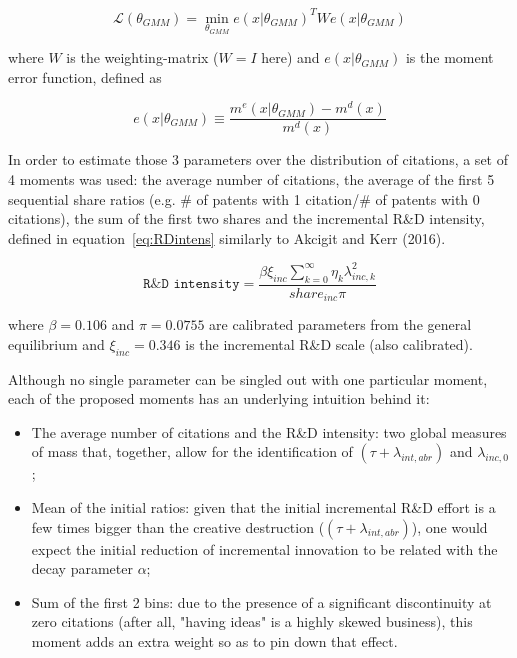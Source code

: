 \documentclass[letterpaper,12pt]{article}
\theoremstyle{definition}
\begin{document}
\begin{equation} \label{eq:GMM}
\mathscr{L}(\theta_{GMM}) =  \min\limits_{\theta_{GMM}}e(x|\theta_{GMM})^TWe(x|\theta_{GMM})
\end{equation}

\noindent where $W$ is the weighting-matrix ($W = I$ here) and $e(x|\theta_{GMM})$ is the moment error function, defined as

\begin{equation} \label{eq:GMM_error}
e(x|\theta_{GMM}) \equiv \frac{m^e(x|\theta_{GMM}) - m^d(x)}{m^d(x)}
\end{equation}

In order to estimate those 3 parameters over the distribution of citations, a set of 4 moments was used: the average number of citations, the average of the first 5 sequential share ratios (e.g. \# of patents with 1 citation/\# of patents with 0 citations), the sum of the first two shares and the incremental R\&D intensity, defined in equation~\eqref{eq:RDintens} similarly to Akcigit and Kerr (2016).

\begin{equation} \label{eq:RDintens}
\texttt{R\&D intensity} = \frac{\beta\xi_{inc}\displaystyle\sum_{k=0}^{\infty}\eta_k\lambda_{inc,k}^2}{share_{inc}\pi}
\end{equation}

\noindent where $\beta = 0.106$ and $\pi = 0.0755$ are calibrated parameters from the general equilibrium and $\xi_{inc} = 0.346$ is the incremental R\&D scale (also calibrated).

Although no single parameter can be singled out with one particular moment, each of the proposed moments has an underlying intuition behind it:

\begin{itemize}
	\item The average number of citations and the R\&D intensity: two global measures of mass that, together, allow for the identification of $(\tau + \lambda_{int,abr})$ and $\lambda_{inc,0}$;
	\item Mean of the initial ratios: given that the initial incremental R\&D effort is a few times bigger than the creative destruction ($(\tau + \lambda_{int,abr})$), one would expect the initial reduction of incremental innovation to be related with the decay parameter $\alpha$;
	\item Sum of the first 2 bins: due to the presence of a significant discontinuity at zero citations (after all, "having ideas" is a highly skewed business), this moment adds an extra weight so as to pin down that effect.
\end{itemize}
\end{document}
